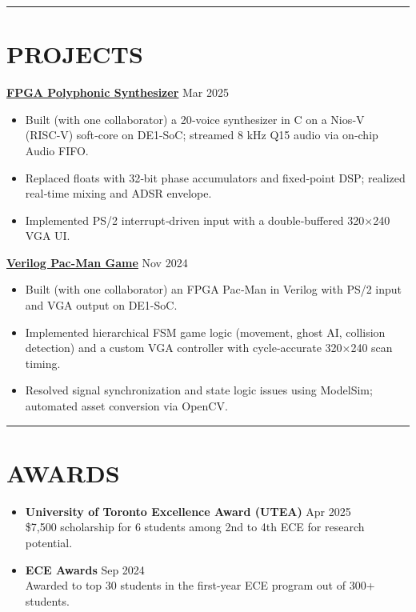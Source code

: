 \documentclass[letterpaper,10pt]{article}
\begin{document}
\noindent\rule{\linewidth}{1pt}

\section*{\textbf{PROJECTS}}

\noindent\href{https://github.com/alexzjm/ece243-sound-synthesizer}{\uline{
\textbf{FPGA Polyphonic Synthesizer}}} \hfill Mar 2025
\begin{itemize}[leftmargin=0.2in]
    \item Built (with one collaborator) a 20‑voice synthesizer in C on a Nios‑V (RISC‑V) soft‑core on DE1-SoC; streamed 8 kHz Q15 audio via on‑chip Audio FIFO.
    \item Replaced floats with 32‑bit phase accumulators and fixed‑point DSP; realized real‑time mixing and ADSR envelope.
    \item Implemented PS/2 interrupt‑driven input with a double‑buffered 320×240 VGA UI.
\end{itemize}

\vspace{0.2cm}
\noindent\href{https://github.com/Ken-2511/ECE241-Project}{\uline{
\textbf{Verilog Pac-Man Game}}} \hfill Nov 2024
\begin{itemize}[leftmargin=0.2in]
    \item Built (with one collaborator) an FPGA Pac‑Man in Verilog with PS/2 input and VGA output on DE1-SoC.
    \item Implemented hierarchical FSM game logic (movement, ghost AI, collision detection) and a custom VGA controller with cycle‑accurate 320×240 scan timing.
    \item Resolved signal synchronization and state logic issues using ModelSim; automated asset conversion via OpenCV.
\end{itemize}

\noindent\rule{\linewidth}{1pt}

\section*{\textbf{AWARDS}}

\begin{itemize}[leftmargin=0.2in]
	\item \textbf{University of Toronto Excellence Award (UTEA)} \hfill Apr 2025\\
    \$7,500 scholarship for 6 students among 2nd to 4th ECE for research potential.
	\item \textbf{ECE Awards} \hfill Sep 2024\\
	Awarded to top 30 students in the first-year ECE program out of 300+ students.
\end{itemize}
\end{document}

